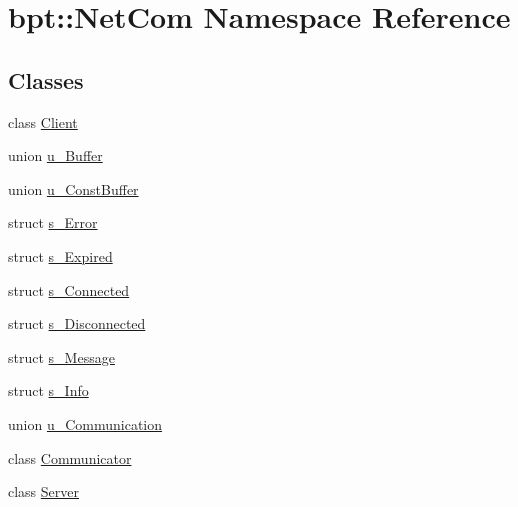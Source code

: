 \hypertarget{namespacebpt_1_1_net_com}{\section{bpt\-:\-:Net\-Com Namespace Reference}
\label{namespacebpt_1_1_net_com}
}
\subsection*{Classes}
\begin{DoxyCompactItemize}
\item 
class \hyperlink{classbpt_1_1_net_com_1_1_client}{Client}
\item 
union \hyperlink{unionbpt_1_1_net_com_1_1u___buffer}{u\-\_\-\-Buffer}
\item 
union \hyperlink{unionbpt_1_1_net_com_1_1u___const_buffer}{u\-\_\-\-Const\-Buffer}
\item 
struct \hyperlink{structbpt_1_1_net_com_1_1s___error}{s\-\_\-\-Error}
\item 
struct \hyperlink{structbpt_1_1_net_com_1_1s___expired}{s\-\_\-\-Expired}
\item 
struct \hyperlink{structbpt_1_1_net_com_1_1s___connected}{s\-\_\-\-Connected}
\item 
struct \hyperlink{structbpt_1_1_net_com_1_1s___disconnected}{s\-\_\-\-Disconnected}
\item 
struct \hyperlink{structbpt_1_1_net_com_1_1s___message}{s\-\_\-\-Message}
\item 
struct \hyperlink{structbpt_1_1_net_com_1_1s___info}{s\-\_\-\-Info}
\item 
union \hyperlink{unionbpt_1_1_net_com_1_1u___communication}{u\-\_\-\-Communication}
\item 
class \hyperlink{classbpt_1_1_net_com_1_1_communicator}{Communicator}
\item 
class \hyperlink{classbpt_1_1_net_com_1_1_server}{Server}
\end{DoxyCompactItemize}
